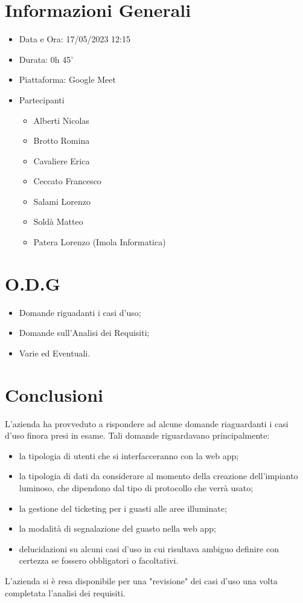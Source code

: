 \documentclass[a4paper, 12pt]{article}
\begin{document}
\makefrontpage
\section*{Informazioni Generali}
\begin{itemize}
    \item Data e Ora: 17/05/2023 12:15
    \item Durata: 0h 45'
    \item Piattaforma: Google Meet
    \item Partecipanti
    \begin{itemize}
        \item Alberti Nicolas
        \item Brotto Romina
        \item Cavaliere Erica
        \item Ceccato Francesco
        \item Salami Lorenzo
        \item Soldà Matteo
        \item Patera Lorenzo (Imola Informatica)
    \end{itemize}
\end{itemize}
\section*{O.D.G}
\begin{itemize}
    \item Domande riguadanti i casi d'uso;
    \item Domande sull'Analisi dei Requisiti;
    \item Varie ed Eventuali.
\end{itemize}
\section*{Conclusioni}
L'azienda ha provveduto a rispondere ad alcune domande riaguardanti i casi d'uso finora presi in esame.
Tali domande riguardavano principalmente:
\begin{itemize}
    \item la tipologia di utenti che si interfacceranno con la web app;
    \item la tipologia di dati da considerare al momento della creazione dell'impianto luminoso, che dipendono dal tipo di protocollo che verrà usato;
    \item la gestione del ticketing per i guasti alle aree illuminate;
    \item la modalità di segnalazione del guasto nella web app;
    \item delucidazioni su alcuni casi d'uso in cui risultava ambiguo definire con certezza se fossero obbligatori o facoltativi.
\end{itemize}
L'azienda si è resa disponibile per una "revisione" dei casi d'uso una volta completata l'analisi dei requisiti.
\end{document}
